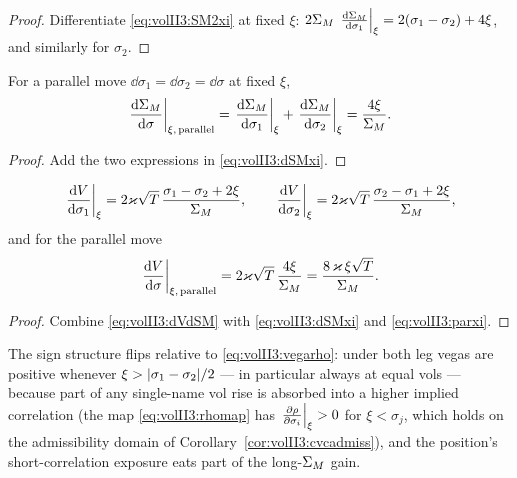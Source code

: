 \begin{proof}
Differentiate \eqref{eq:volII3:SM2xi} at fixed $\xi$:
$2\Sigma_M\,\left.\frac{\mathrm{d} \Sigma_M}{\mathrm{d} \sigma_1}\right|_{\xi} = 2(\sigma_1 - \sigma_2) + 4\xi$,
and similarly for $\sigma_2$.
\end{proof}

\begin{corollary}\label{cor:volII3:parxi}
For a parallel move $\dd\sigma_1 = \dd\sigma_2 = \dd\sigma$ at fixed $\xi$,
\begin{equation}\label{eq:volII3:parxi}
\left.\frac{\mathrm{d} \Sigma_M}{\mathrm{d} \sigma}\right|_{\xi,\,\text{parallel}}
= \left.\frac{\mathrm{d} \Sigma_M}{\mathrm{d} \sigma_1}\right|_{\xi} + \left.\frac{\mathrm{d} \Sigma_M}{\mathrm{d} \sigma_2}\right|_{\xi}
= \frac{4\xi}{\Sigma_M} .
\end{equation}
\end{corollary}

\begin{proof}
Add the two expressions in \eqref{eq:volII3:dSMxi}.
\end{proof}

\begin{proposition}\label{prop:volII3:vegaxi}
\begin{equation}\label{eq:volII3:vegaxi}
\left.\frac{\mathrm{d} V}{\mathrm{d} \sigma_1}\right|_{\xi}
= 2\varkappa\sqrt{T}\,\frac{\sigma_1 - \sigma_2 + 2\xi}{\Sigma_M},
\qquad
\left.\frac{\mathrm{d} V}{\mathrm{d} \sigma_2}\right|_{\xi}
= 2\varkappa\sqrt{T}\,\frac{\sigma_2 - \sigma_1 + 2\xi}{\Sigma_M},
\end{equation}
and for the parallel move
\begin{equation}\label{eq:volII3:parvegaxi}
\left.\frac{\mathrm{d} V}{\mathrm{d} \sigma}\right|_{\xi,\,\text{parallel}}
= 2\varkappa\sqrt{T}\,\frac{4\xi}{\Sigma_M}
= \frac{8\,\varkappa\,\xi\sqrt{T}}{\Sigma_M} .
\end{equation}
\end{proposition}

\begin{proof}
Combine \eqref{eq:volII3:dVdSM} with \eqref{eq:volII3:dSMxi} and
\eqref{eq:volII3:parxi}.
\end{proof}

The sign structure flips relative to \eqref{eq:volII3:vegarho}: under \stickycvc{}
both leg vegas are positive whenever $\xi > \lvert\sigma_1 - \sigma_2\rvert/2$ ---
in particular always at equal vols --- because part of any single-name vol
rise is absorbed into a higher implied correlation (the map
\eqref{eq:volII3:rhomap} has $\left.\frac{\partial \rho}{\partial \sigma_i}\right|_{\xi} > 0$ for
$\xi < \sigma_j$, which holds on the admissibility domain of
Corollary~\ref{cor:volII3:cvcadmiss}), and the position's short-correlation
exposure eats part of the long-$\Sigma_M$ gain.

